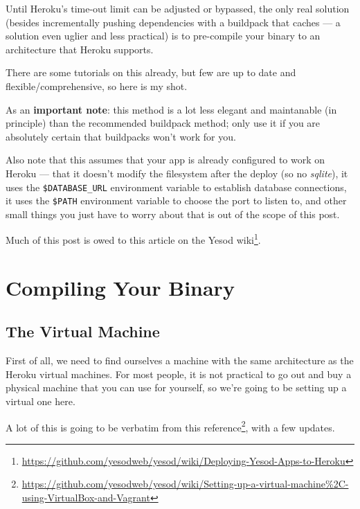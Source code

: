 \documentclass[]{article}
\renewcommand{\href}[2]{#2\footnote{\url{#1}}}
\begin{document}
Until Heroku's time-out limit can be adjusted or bypassed, the only real
solution (besides incrementally pushing dependencies with a buildpack
that caches --- a solution even uglier and less practical) is to
pre-compile your binary to an architecture that Heroku supports.

There are some tutorials on this already, but few are up to date and
flexible/comprehensive, so here is my shot.

As an \textbf{important note}: this method is a lot less elegant and
maintanable (in principle) than the recommended buildpack method; only
use it if you are absolutely certain that buildpacks won't work for you.

Also note that this assumes that your app is already configured to work
on Heroku --- that it doesn't modify the filesystem after the deploy (so
no \emph{sqlite}), it uses the \texttt{\$DATABASE\_URL} environment
variable to establish database connections, it uses the \texttt{\$PATH}
environment variable to choose the port to listen to, and other small
things you just have to worry about that is out of the scope of this
post.

Much of this post is owed to
\href{https://github.com/yesodweb/yesod/wiki/Deploying-Yesod-Apps-to-Heroku}{this
article on the Yesod wiki}.

\section{Compiling Your Binary}\label{compiling-your-binary}

\subsection{The Virtual Machine}\label{the-virtual-machine}

First of all, we need to find ourselves a machine with the same
architecture as the Heroku virtual machines. For most people, it is not
practical to go out and buy a physical machine that you can use for
yourself, so we're going to be setting up a virtual one here.

A lot of this is going to be verbatim from
\href{https://github.com/yesodweb/yesod/wiki/Setting-up-a-virtual-machine\%2C-using-VirtualBox-and-Vagrant}{this
reference}, with a few updates.
\end{document}
